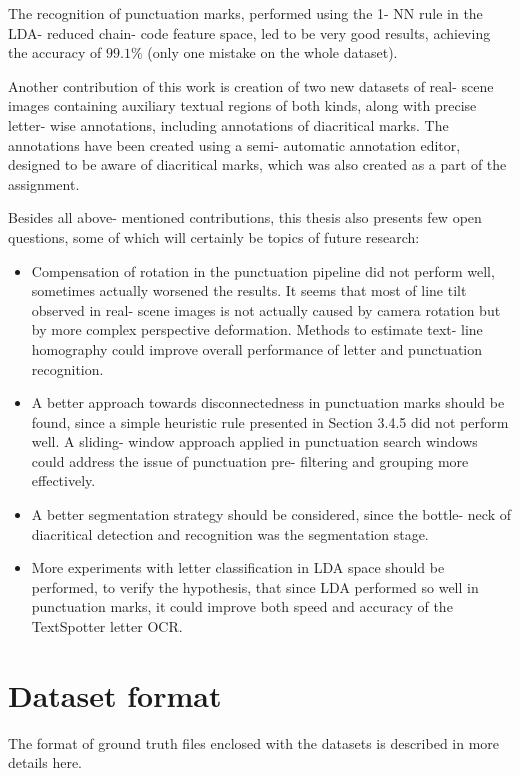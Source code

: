 \documentclass[12pt,a4paper]{report}
\begin{document}
The recognition of punctuation marks, performed using the 1- NN rule in the LDA- reduced chain- code feature space, led to be very good results, achieving the accuracy of $99.1\%$ (only one mistake on the whole dataset).

Another contribution of this work is creation of two new datasets of real- scene images containing auxiliary textual regions of both kinds, along with precise letter- wise annotations, including annotations of diacritical marks. The annotations have been created using a semi- automatic annotation editor, designed to be aware of diacritical marks, which was also created as a part of the assignment.

Besides all above- mentioned contributions, this thesis also presents few open questions, some of which will certainly be topics of future research:
\begin{itemize}
    \item Compensation of rotation in the punctuation pipeline did not perform well, sometimes actually worsened the results. It seems that most of line tilt observed in real- scene images is not actually caused by camera rotation but by more complex perspective deformation. Methods to estimate text- line homography could improve overall performance of letter and punctuation recognition.
    \item A better approach towards disconnectedness in punctuation marks should be found, since a simple heuristic rule presented in Section 3.4.5 did not perform well. A sliding- window approach applied in punctuation search windows could address the issue of punctuation pre- filtering and grouping more effectively.
    \item A better segmentation strategy should be considered, since the bottle- neck of diacritical detection and recognition was the segmentation stage.
    \item More experiments with letter classification in LDA space should be performed, to verify the hypothesis, that since LDA performed so well in punctuation marks, it could improve both speed and accuracy of the TextSpotter letter OCR.
\end{itemize}

\appendix
\chapter{Dataset format}
The format of ground truth files enclosed with the datasets is described in more details here.
\end{document}
